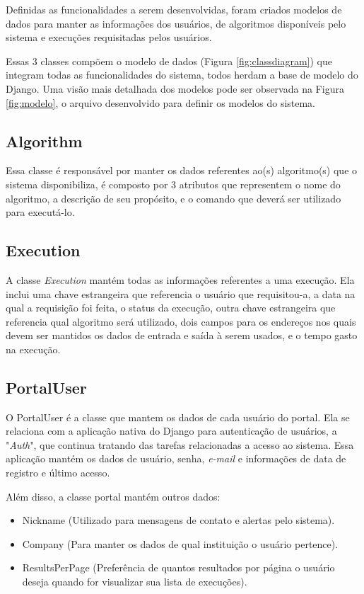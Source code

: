 \documentclass[tg]{mdtufsm}
\begin{document}
Definidas as funcionalidades a serem desenvolvidas, foram criados modelos de dados para manter as informações dos usuários, de algoritmos disponíveis pelo sistema e execuções requisitadas pelos usuários.

Essas 3 classes compõem o modelo de dados (Figura \ref{fig:classdiagram}) que integram todas as funcionalidades do sistema, todos herdam a base de modelo do Django. Uma visão mais detalhada dos modelos pode ser observada na Figura \ref{fig:modelo}, o arquivo desenvolvido para definir os modelos do sistema.


\subsection{Algorithm}
Essa classe é responsável por manter os dados referentes ao(s) algoritmo(s) que o sistema disponibiliza, é composto por 3 atributos que representem o nome do algoritmo, a descrição de seu propósito, e o comando que deverá ser utilizado para executá-lo.

\subsection{Execution}
A classe \emph{Execution} mantém todas as informações referentes a uma execução. Ela inclui uma chave estrangeira que referencia o usuário que requisitou-a, a data na qual a requisição foi feita, o status da execução, outra chave estrangeira que referencia qual algoritmo será utilizado, dois campos para os endereços nos quais devem ser mantidos os dados de entrada e saída à serem usados, e o tempo gasto na execução.

\subsection{PortalUser}
O PortalUser é a classe que mantem os dados de cada usuário do portal. Ela se relaciona com a aplicação nativa do Django para autenticação de usuários, a "\emph{Auth}", que continua tratando das tarefas relacionadas a acesso ao sistema. Essa aplicação mantém os dados de usuário, senha, \emph{e-mail} e informações de data de registro e último acesso.

Além disso, a classe portal mantém outros dados:
\begin{itemize}
	\item Nickname (Utilizado para mensagens de contato e alertas pelo sistema).
	\item Company (Para manter os dados de qual instituição o usuário pertence).
	\item ResultsPerPage (Preferência de quantos resultados por página o usuário deseja quando for visualizar sua lista de execuções).
\end{itemize}
\end{document}
